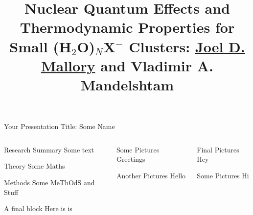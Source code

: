 \documentclass[t,10pt,mathserif,xcolor=pst,pdftex,final,hyperref={pdfpagelabels=false}]{beamer}
\title[\footnotesize{Diffusion Monte Carlo}]{Nuclear Quantum Effects and Thermodynamic Properties for Small (H$_2$O)$_N$X$^-$ Clusters: \underline{Joel D. Mallory} and Vladimir A. Mandelshtam}
\author[\footnotesize{Acknowledgments: Shane Flynn}]{}
\institute[\footnotesize{Department of Chemistry, University of California, Irvine}]{}
\begin{document}
\begin{frame}{\Large{Your Presentation Title: Some Name}}
\begin{columns}[t]
\begin{column}{0.33\linewidth}
\begin{block}{Research Summary}
	Some text
\end{block}

\begin{block}{Theory}
	Some Maths
\end{block}

\begin{block}{Methods}
	Some MeThOdS and Stuff
\end{block}

\begin{block}{A final block}
	Here is is
\end{block}

\end{column}
\begin{column}{0.33\linewidth}
\begin{block}{Some Pictures}
Greetings
\end{block}

\begin{block}{Another Pictures}
Hello
\end{block}
	
\end{column}
\begin{column}{0.33\linewidth}
\begin{block}{Final Pictures}
Hey
\end{block}

\begin{block}{Some Pictures}
Hi
\end{block}
\end{column}
\end{columns}
\end{frame}
\end{document}
